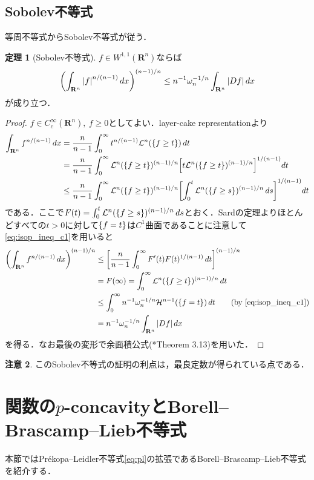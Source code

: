\documentclass[a4j]{ltjsarticle}
\newcommand{\Rset}{\mathbf{R}}
\newcommand{\Lm}{\mathcal{L}}
\newcommand{\Hm}{\mathcal{H}}
\newcommand{\1}{\bm{1}}
\numberwithin{equation}{section}
\theoremstyle{definition}
\newtheorem{thm}{定理}[section]
\newtheorem{rmk}[thm]{注意}
\begin{document}
\subsection{Sobolev不等式}
等周不等式からSobolev不等式が従う．
\begin{thm}[Sobolev不等式]
    $f\in W^{1,1}(\Rset^n)$ならば
    \begin{equation}
        \qty(\int_{\Rset^n}\abs{f}^{n/(n-1)}\,dx)^{(n-1)/n}\leq n^{-1}\omega_n^{-1/n}\int_{\Rset^n}\abs{Df}\,dx
    \end{equation}
    が成り立つ．
\end{thm}
\begin{proof}
    $f\in C^\infty_c(\Rset^n),\ f\geq0$としてよい．layer-cake representationより
    \begin{align}
        \int_{\Rset^n}f^{n/(n-1)}\,dx&=\frac{n}{n-1}\int_{0}^{\infty}t^{n/(n-1)}\Lm^n(\qty{f\geq t})\,dt\\
        &=\frac{n}{n-1}\int_{0}^{\infty}\Lm^n(\qty{f\geq t})^{(n-1)/n}\qty[t\Lm^n(\qty{f\geq t})^{(n-1)/n}]^{1/(n-1)}dt\\
        &\leq \frac{n}{n-1}\int_{0}^{\infty}\Lm^n(\qty{f\geq t})^{(n-1)/n}\qty[\int_{0}^{t}\Lm^n(\qty{f\geq s})^{(n-1)/n}\,ds]^{1/(n-1)}dt
    \end{align}
    である．ここで$F(t)=\int_{0}^{t}\Lm^n(\qty{f\geq s})^{(n-1)/n}\,ds$とおく．Sardの定理よりほとんどすべての$t>0$に対して$\qty{f=t}$は$C^1$曲面であることに注意して\eqref{eq:isop_ineq_c1}を用いると
    \begin{align}
        \qty(\int_{\Rset^n}f^{n/(n-1)}\,dx)^{(n-1)/n}&\leq \qty[\frac{n}{n-1}\int_{0}^{\infty}F'(t)F(t)^{1/(n-1)}\,dt]^{(n-1)/n}\\
        &=F(\infty)=\int_{0}^{\infty}\Lm^n(\qty{f\geq t})^{(n-1)/n}\,dt\\
        &\leq \int_{0}^{\infty}n^{-1}\omega_n^{-1/n}\Hm^{n-1}(\qty{f=t})\,dt\quad\quad (\text{by \eqref{eq:isop_ineq_c1}})\\
        &=n^{-1}\omega_n^{-1/n}\int_{\Rset^n}\abs{Df}\,dx 
    \end{align}
    を得る．なお最後の変形で余面積公式(\cite{EG}*{Theorem 3.13})を用いた．
\end{proof}
\begin{rmk}
    このSobolev不等式の証明の利点は，最良定数が得られている点である．
\end{rmk}

\section{関数の\texorpdfstring{$p$}{TEXT}-concavityとBorell--Brascamp--Lieb不等式}
本節ではPr\'ekopa--Leidler不等式\eqref{eq:pl}の拡張であるBorell--Brascamp--Lieb不等式を紹介する．
\end{document}
